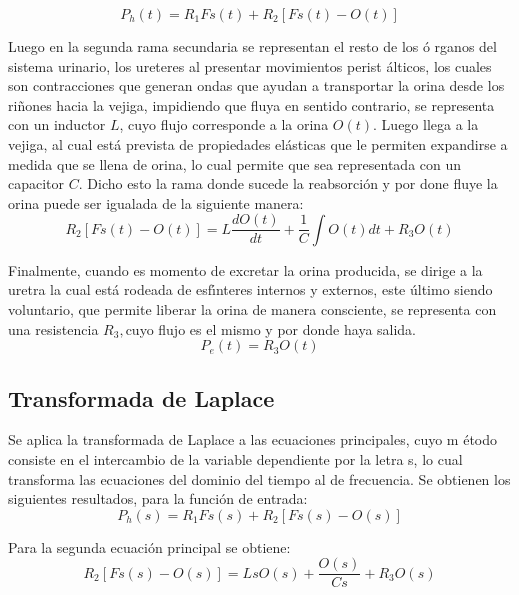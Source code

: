 \documentclass[letterpaper,11pt]{article}
\begin{document}
\begin{equation*}
P_{h}(t)=R_{1}Fs(t)+R_{2}\left[ Fs(t)-O(t)\right]
\end{equation*}

Luego en la segunda rama secundaria se representan el resto de los \'{o}%
rganos del sistema urinario, los ureteres al presentar movimientos perist%
\'{a}lticos, los cuales son contracciones que generan ondas que ayudan a
transportar la orina desde los ri\~{n}ones hacia la vejiga, impidiendo que
fluya en sentido contrario, se representa con un inductor $L$, cuyo flujo
corresponde a la orina $O(t)$. Luego llega a la vejiga, al cual est\'{a}
prevista de propiedades el\'{a}sticas que le permiten expandirse a medida
que se llena de orina, lo cual permite que sea representada con un capacitor 
$C$. Dicho esto la rama donde sucede la reabsorci\'{o}n y por done fluye la
orina puede ser igualada de la siguiente manera: 
\begin{equation*}
R_{2}\left[ Fs(t)-O(t)\right] =L\frac{dO(t)}{dt}+\frac{1}{C}\int
O(t)dt+R_{3}O(t)
\end{equation*}

Finalmente, cuando es momento de excretar la orina producida, se dirige a la
uretra la cual est\'{a} rodeada de esf\'{\i}nteres internos y externos, este 
\'{u}ltimo siendo voluntario, que permite liberar la orina de manera
consciente, se representa con una resistencia $R_{3},$cuyo flujo es el mismo
y por donde haya salida.%
\begin{equation*}
P_{e}(t)=R_{3}O(t)
\end{equation*}

\subsection{Transformada de Laplace}

Se aplica la transformada de Laplace a las ecuaciones principales, cuyo m%
\'{e}todo consiste en el intercambio de la variable dependiente por la letra
s, lo cual transforma las ecuaciones del dominio del tiempo al de
frecuencia. Se obtienen los siguientes resultados, para la funci\'{o}n de
entrada:%
\begin{equation*}
P_{h}(s)=R_{1}Fs(s)+R_{2}\left[ Fs(s)-O(s)\right] 
\end{equation*}

Para la segunda ecuaci\'{o}n principal se obtiene:%
\begin{equation*}
R_{2}\left[ Fs(s)-O(s)\right] =LsO(s)+\frac{O(s)}{Cs}+R_{3}O(s)
\end{equation*}
\end{document}
